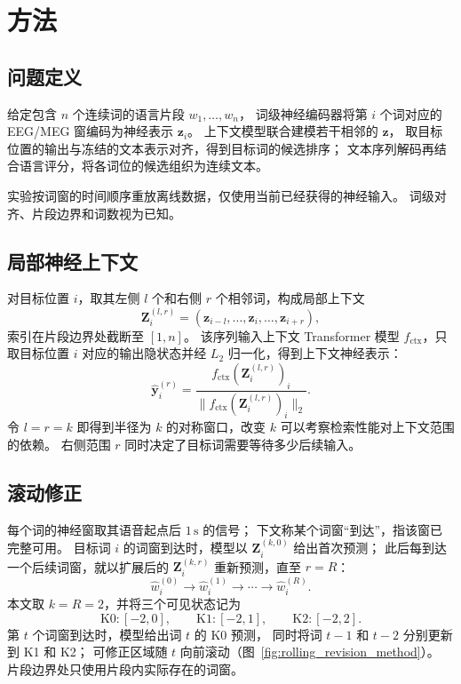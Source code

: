 
\section{方法}

\subsection{问题定义}

给定包含 $n$ 个连续词的语言片段 $w_1,\ldots,w_n$，
词级神经编码器将第 $i$ 个词对应的 EEG/\allowbreak{}MEG 窗编码为神经表示 $\mathbf z_i$。
上下文模型联合建模若干相邻的 $\mathbf z$，
取目标位置的输出与冻结的文本表示对齐，得到目标词的候选排序；
文本序列解码再结合语言评分，将各词位的候选组织为连续文本。

实验按词窗的时间顺序重放离线数据，仅使用当前已经获得的神经输入。
词级对齐、片段边界和词数视为已知。


\subsection{局部神经上下文}

对目标位置 $i$，取其左侧 $l$ 个和右侧 $r$ 个相邻词，构成局部上下文
\[
\mathbf{Z}_i^{(l,r)}
=(\mathbf{z}_{i-l},\ldots,\mathbf{z}_i,\ldots,\mathbf{z}_{i+r}),
\]
索引在片段边界处截断至 $[1,n]$。
该序列输入上下文 Transformer 模型 $f_{\mathrm{ctx}}$，只取目标位置 $i$ 对应的输出隐状态并经 $L_2$ 归一化，得到上下文神经表示：
\[
\hat{\mathbf{y}}_i^{(r)} = \frac{f_{\mathrm{ctx}}(\mathbf{Z}_i^{(l,r)})_i}{\|f_{\mathrm{ctx}}(\mathbf{Z}_i^{(l,r)})_i\|_2} .
\]
令 $l=r=k$ 即得到半径为 $k$ 的对称窗口，改变 $k$ 可以考察检索性能对上下文范围的依赖。
右侧范围 $r$ 同时决定了目标词需要等待多少后续输入。


\subsection{滚动修正}

每个词的神经窗取其语音起点后 $1\,\mathrm{s}$ 的信号；
下文称某个词窗“到达”，指该窗已完整可用。
目标词 $i$ 的词窗到达时，模型以 $\mathbf Z_i^{(k,0)}$ 给出首次预测；
此后每到达一个后续词窗，就以扩展后的 $\mathbf Z_i^{(k,r)}$ 重新预测，直至 $r=R$：
\[
\hat{w}_i^{(0)}\rightarrow\hat{w}_i^{(1)}\rightarrow\cdots\rightarrow\hat{w}_i^{(R)}.
\]
本文取 $k=R=2$，并将三个可见状态记为
\[
\mathrm{K0}:[-2,0],\qquad\mathrm{K1}:[-2,1],\qquad\mathrm{K2}:[-2,2].
\]
第 $t$ 个词窗到达时，模型给出词 $t$ 的 K0 预测，
同时将词 $t-1$ 和 $t-2$ 分别更新到 K1 和 K2；
可修正区域随 $t$ 向前滚动（图~\ref{fig:rolling_revision_method}）。
片段边界处只使用片段内实际存在的词窗。

